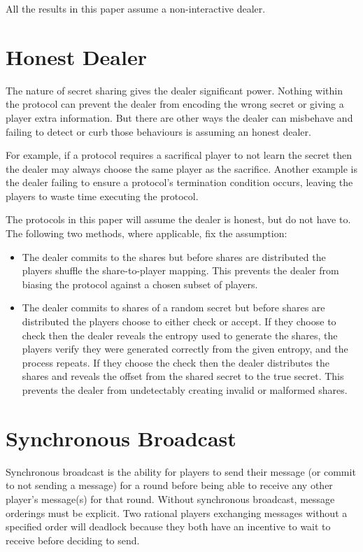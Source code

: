 \documentclass{dalcsthesis}
\begin{document}
All the results in this paper assume a non-interactive dealer.

\section{Honest Dealer}

The nature of secret sharing gives the dealer significant power. Nothing within the protocol can prevent the dealer from encoding the wrong secret or giving a player extra information. But there are other ways the dealer can misbehave and failing to detect or curb those behaviours is assuming an honest dealer.

For example, if a protocol requires a sacrifical player to not learn the secret then the dealer may always choose the same player as the sacrifice. Another example is the dealer failing to ensure a protocol's termination condition occurs, leaving the players to waste time executing the protocol.

The protocols in this paper will assume the dealer is honest, but do not have to. The following two methods, where applicable, fix the assumption:

\begin{itemize}
  \item The dealer commits to the shares but before shares are distributed the players shuffle the share-to-player mapping. This prevents the dealer from biasing the protocol against a chosen subset of players.
  \item The dealer commits to shares of a random secret but before shares are distributed the players choose to either check or accept. If they choose to check then the dealer reveals the entropy used to generate the shares, the players verify they were generated correctly from the given entropy, and the process repeats. If they choose the check then the dealer distributes the shares and reveals the offset from the shared secret to the true secret. This prevents the dealer from undetectably creating invalid or malformed shares.
\end{itemize} 

\section{Synchronous Broadcast}

Synchronous broadcast is the ability for players to send their message (or commit to not sending a message) for a round before being able to receive any other player's message(s) for that round. Without synchronous broadcast, message orderings must be explicit. Two rational players exchanging messages without a specified order will deadlock because they both have an incentive to wait to receive before deciding to send.
\end{document}
